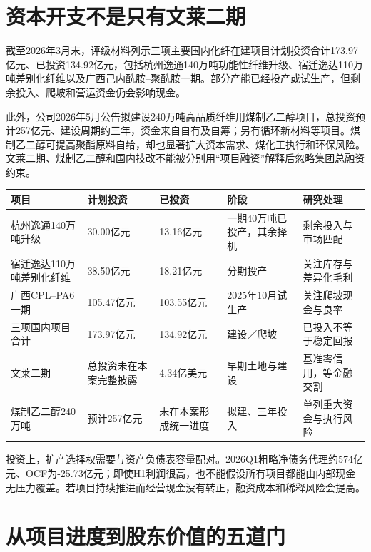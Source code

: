 \section{资本开支不是只有文莱二期}

截至2026年3月末，评级材料列示三项主要国内化纤在建项目计划投资合计173.97亿元、已投资134.92亿元，包括杭州逸通140万吨功能性纤维升级、宿迁逸达110万吨差别化纤维以及广西己内酰胺--聚酰胺一期。部分产能已经投产或试生产，但剩余投入、爬坡和营运资金仍会影响现金。

此外，公司2026年5月公告拟建设240万吨高品质纤维用煤制乙二醇项目，总投资预计257亿元、建设周期约三年，资金来自自有及自筹；另有循环新材料等项目。煤制乙二醇可提高聚酯原料自给，却也显著扩大资本需求、煤化工执行和环保风险。文莱二期、煤制乙二醇和国内技改不能被分别用“项目融资”解释后忽略集团总融资约束。

\begin{exhibitbox}[主要资本项目与现金约束]
\small
\noindent\begin{tabularx}{\textwidth}{L{3.05cm}R{2.0cm}R{2.0cm}L{2.15cm}X}
\toprule
\textbf{项目} & \textbf{计划投资} & \textbf{已投资} & \textbf{阶段} & \textbf{研究处理} \\
\midrule
杭州逸通140万吨升级 & 30.00亿元 & 13.16亿元 & 一期40万吨已投产，其余择机 & 剩余投入与市场匹配 \\
宿迁逸达110万吨差别化纤维 & 38.50亿元 & 18.21亿元 & 分期投产 & 关注库存与差异化毛利 \\
广西CPL--PA6一期 & 105.47亿元 & 103.55亿元 & 2025年10月试生产 & 关注爬坡现金与良率 \\
三项国内项目合计 & 173.97亿元 & 134.92亿元 & 建设／爬坡 & 已投入不等于稳定回报 \\
文莱二期 & 总投资未在本案完整披露 & 4.34亿美元 & 早期土地与建设 & 基准零信用，等金融交割 \\
煤制乙二醇240万吨 & 预计257亿元 & 未在本案形成统一进度 & 拟建、三年投入 & 单列重大资金与执行风险 \\
\bottomrule
\end{tabularx}
\end{exhibitbox}

投资上，扩产选择权需要与资产负债表容量配对。2026Q1粗略净债务代理约574亿元、OCF为-25.73亿元；即使H1利润很高，也不能假设所有项目都能由内部现金无压力覆盖。若项目持续推进而经营现金没有转正，融资成本和稀释风险会提高。

\section{从项目进度到股东价值的五道门}

